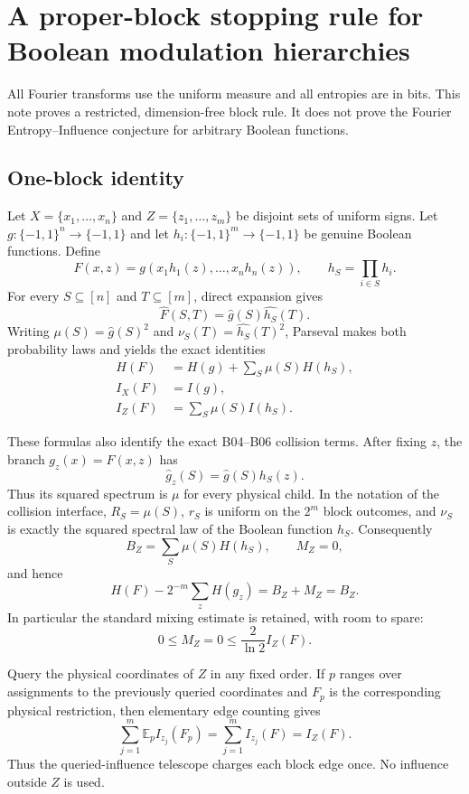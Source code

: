 \section*{A proper-block stopping rule for Boolean modulation hierarchies}

All Fourier transforms use the uniform measure and all entropies are in bits.
This note proves a restricted, dimension-free block rule.  It does not prove
the Fourier Entropy--Influence conjecture for arbitrary Boolean functions.

\subsection*{One-block identity}

Let $X=\{x_1,\ldots,x_n\}$ and $Z=\{z_1,\ldots,z_m\}$ be disjoint sets of
uniform signs.  Let $g:\{-1,1\}^n\to\{-1,1\}$ and let
$h_i:\{-1,1\}^m\to\{-1,1\}$ be genuine Boolean functions.  Define
\[
 F(x,z)=g(x_1h_1(z),\ldots,x_nh_n(z)),
 \qquad h_S=\prod_{i\in S}h_i.
\]
For every $S\subseteq[n]$ and $T\subseteq[m]$, direct expansion gives
\[
 \widehat F(S,T)=\widehat g(S)\widehat {h_S}(T).                 \tag{1}
\]
Writing $\mu(S)=\widehat g(S)^2$ and
$\nu_S(T)=\widehat {h_S}(T)^2$, Parseval makes both probability laws and
yields the exact identities
\begin{align}
 H(F)&=H(g)+\sum_S\mu(S)H(h_S),                                \tag{2}\\
 I_X(F)&=I(g),                                                   \tag{3}\\
 I_Z(F)&=\sum_S\mu(S)I(h_S).                                   \tag{4}
\end{align}

These formulas also identify the exact B04--B06 collision terms.  After
fixing $z$, the branch $g_z(x)=F(x,z)$ has
\[
 \widehat g_z(S)=\widehat g(S)h_S(z).
\]
Thus its squared spectrum is $\mu$ for every physical child.  In the
notation of the collision interface, $R_S=\mu(S)$, $r_S$ is uniform on the
$2^m$ block outcomes, and $\nu_S$ is exactly the squared spectral law of the
Boolean function $h_S$.  Consequently
\[
 B_Z=\sum_S\mu(S)H(h_S),\qquad M_Z=0,                           \tag{5}
\]
and hence
\[
 H(F)-2^{-m}\sum_zH(g_z)=B_Z+M_Z=B_Z.                          \tag{6}
\]
In particular the standard mixing estimate is retained, with room to spare:
\[
 0\le M_Z=0\le \frac{2}{\ln2}I_Z(F).                           \tag{7}
\]

Query the physical coordinates of $Z$ in any fixed order.  If $p$ ranges
over assignments to the previously queried coordinates and $F_p$ is the
corresponding physical restriction, then elementary edge counting gives
\[
 \sum_{j=1}^m \mathbb E_p I_{z_j}(F_p)
 =\sum_{j=1}^m I_{z_j}(F)=I_Z(F).                              \tag{8}
\]
Thus the queried-influence telescope charges each block edge once.  No
influence outside $Z$ is used.

